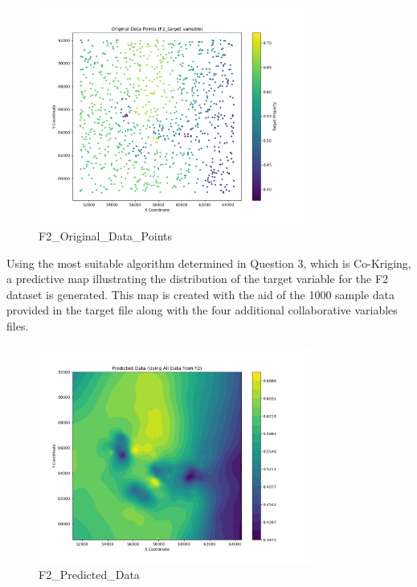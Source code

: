 \documentclass{swmcmthesis}
\begin{document}
\begin{figure}[h!t]
	\centering
	\includegraphics[width=0.8\textwidth]{Problem 4/Problem 4/F2_Original_Data_Points.png}
	\caption{F2\_Original\_Data\_Points}
\end{figure}

Using the most suitable algorithm determined in Question 3, which is Co-Kriging, a predictive map illustrating the distribution of the target variable for the F2 dataset is generated. This map is created with the aid of the 1000 sample data provided in the target file along with the four additional collaborative variables files.



\begin{figure}[h!t]
	\centering
	\includegraphics[width=0.8\textwidth]{Problem 4/Problem 4/F2_Predicted_Data_Full_Data.png}
	\caption{F2\_Predicted\_Data}
\end{figure}
\end{document}
